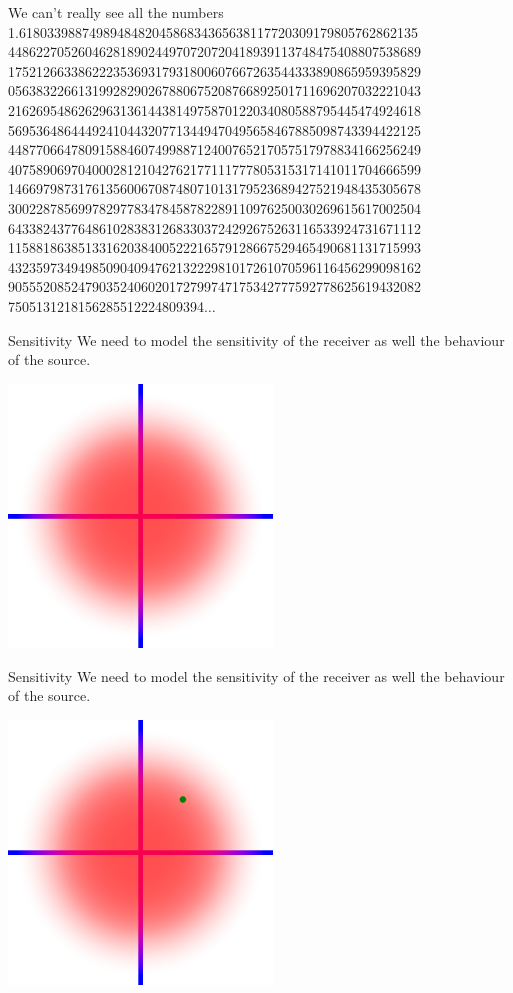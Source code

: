\documentclass{beamer}
\newcommand{\crish}{\color{reddish}}
\newcommand{\cbla}{\color{black}}
\begin{document}
\begin{frame}{We can't really see all the numbers}
  \crish
  1.61\color{lightgray}8033988749894848204586834365638117720309179805762862135
  44862270526046281890244970720720418939113748475408807538689
  17521266338622235369317931800607667263544333890865959395829
  05638322661319928290267880675208766892501711696207032221043
  21626954862629631361443814975870122034080588795445474924618
  56953648644492410443207713449470495658467885098743394422125
  44877066478091588460749988712400765217057517978834166256249
  40758906970400028121042762177111777805315317141011704666599
  14669798731761356006708748071013179523689427521948435305678
  30022878569978297783478458782289110976250030269615617002504
  64338243776486102838312683303724292675263116533924731671112
  11588186385133162038400522216579128667529465490681131715993
  43235973494985090409476213222981017261070596116456299098162
  90555208524790352406020172799747175342777592778625619432082
  7505131218156285512224809394$\ldots$
\cbla
  \end{frame}


\begin{frame}{Sensitivity}
 We need to model the sensitivity of the receiver as well the
 behaviour of the source.
  \begin{center}
\includegraphics[width=7cm]{cont1.png}
  \end{center}  
\end{frame}


\begin{frame}{Sensitivity}
 We need to model the sensitivity of the receiver as well the
 behaviour of the source.
  \begin{center}
\includegraphics[width=7cm]{cont2.png}
  \end{center}  
\end{frame}
\end{document}
